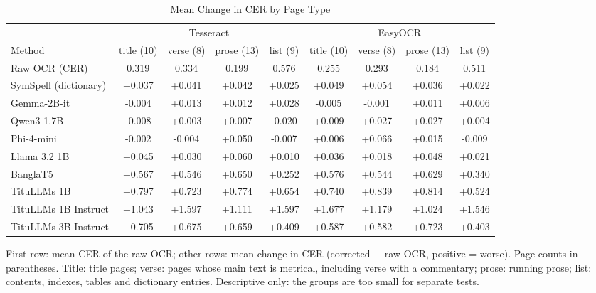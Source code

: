 \begin{table}[t]
\centering
\caption{Mean Change in CER by Page Type}
\label{tab:pagetypes}
\setlength{\tabcolsep}{4pt}
\footnotesize
\begin{tabular}{lcccccccc}
\toprule
 & \multicolumn{4}{c}{Tesseract} & \multicolumn{4}{c}{EasyOCR} \\
\cmidrule(lr){2-5}\cmidrule(lr){6-9}
Method & title (10) & verse (8) & prose (13) & list (9) & title (10) & verse (8) & prose (13) & list (9) \\
\midrule
Raw OCR (CER) & 0.319 & 0.334 & 0.199 & 0.576 & 0.255 & 0.293 & 0.184 & 0.511 \\
\midrule
SymSpell (dictionary) & +0.037 & +0.041 & +0.042 & +0.025 & +0.049 & +0.054 & +0.036 & +0.022 \\
Gemma-2B-it & -0.004 & +0.013 & +0.012 & +0.028 & -0.005 & -0.001 & +0.011 & +0.006 \\
Qwen3 1.7B & -0.008 & +0.003 & +0.007 & -0.020 & +0.009 & +0.027 & +0.027 & +0.004 \\
Phi-4-mini & -0.002 & -0.004 & +0.050 & -0.007 & +0.006 & +0.066 & +0.015 & -0.009 \\
Llama 3.2 1B & +0.045 & +0.030 & +0.060 & +0.010 & +0.036 & +0.018 & +0.048 & +0.021 \\
BanglaT5 & +0.567 & +0.546 & +0.650 & +0.252 & +0.576 & +0.544 & +0.629 & +0.340 \\
TituLLMs 1B & +0.797 & +0.723 & +0.774 & +0.654 & +0.740 & +0.839 & +0.814 & +0.524 \\
TituLLMs 1B Instruct & +1.043 & +1.597 & +1.111 & +1.597 & +1.677 & +1.179 & +1.024 & +1.546 \\
TituLLMs 3B Instruct & +0.705 & +0.675 & +0.659 & +0.409 & +0.587 & +0.582 & +0.723 & +0.403 \\
\bottomrule
\end{tabular}
\par\smallskip
\begin{minipage}{\linewidth}\footnotesize First row: mean CER of the raw OCR; other rows: mean change in CER (corrected $-$ raw OCR, positive = worse). Page counts in parentheses. Title: title pages; verse: pages whose main text is metrical, including verse with a commentary; prose: running prose; list: contents, indexes, tables and dictionary entries. Descriptive only: the groups are too small for separate tests.\end{minipage}
\end{table}
